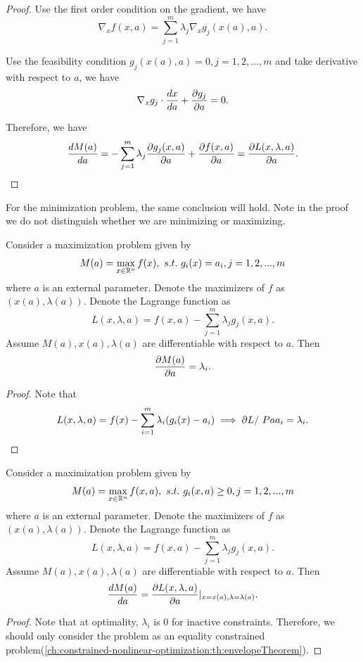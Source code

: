 \begin{refsection}
\begin{proof}
	Use the first order condition on the gradient, we have
	$$ \nabla_x f(x,a)= \sum_{j=1}^m \lambda_j \nabla_x g_j(x(a),a).$$
	
	Use the feasibility condition $g_j(x(a),a) = 0, j=1,2,...,m$ and take derivative with respect to $a$, we have
	$$\nabla_x g_j \cdot \frac{dx}{da} + \frac{\partial g_j}{\partial a} = 0.$$
	
Therefore, we have
		$$\frac{dM(a)}{da} = -\sum_{j=1}^m \lambda_j \frac{\partial g_j(x,a)}{\partial a} +  \frac{\partial f(x,a)}{\partial a} = \frac{\partial L(x,\lambda, a)}{\partial a}.$$
\end{proof}

\begin{remark}
For the minimization problem, the same conclusion will hold. Note in the proof we do not distinguish whether we are minimizing or maximizing. 
	
\end{remark}

\begin{corollary}\cite[369]{jiang2000advanced}\cite[605]{jehle2011advanced}
	Consider a maximization problem given by
	$$M(a) = \max_{x\in \mathbb{R}^n} f(x), ~s.t.~ g_i(x) = a_i, j=1,2,...,m$$
	where $a$ is an external parameter.  Denote the maximizers of $f$ as $(x(a),\lambda(a))$. Denote the Lagrange function as
	$$L(x,\lambda,a) = f(x,a) - \sum_{j=1}^m \lambda_j g_j(x,a).$$
	Assume $M(a), x(a), \lambda(a)$ are differentiable with respect to $a$.
	Then
	$$\frac{\partial M(a)}{\partial a} = \lambda_i.$$
\end{corollary}
\begin{proof}
Note that 
$$L(x,\lambda, a) = f(x) -\sum_{i=1}^{m} \lambda_i(g_i(x) - a_i) \implies \partial L /\ Pa a_i = \lambda_i.$$
\end{proof}


\begin{lemma}\cite[369]{jiang2000advanced}\cite[605]{jehle2011advanced}
	Consider a maximization problem given by
	$$M(a) = \max_{x\in \mathbb{R}^n} f(x,a), ~s.t.~ g_i(x,a) \geq 0, j=1,2,...,m$$
	where $a$ is an external parameter.  Denote the maximizers of $f$ as $(x(a),\lambda(a))$. Denote the Lagrange function as
	$$L(x,\lambda,a) = f(x,a) - \sum_{j=1}^m \lambda_j g_j(x,a).$$
	Assume $M(a), x(a), \lambda(a)$ are differentiable with respect to $a$.
	Then
	$$\frac{dM(a)}{da} = \frac{\partial L(x,\lambda,a)}{\partial a}|_{x=x(a), \lambda = \lambda(a)}.$$
\end{lemma}
\begin{proof}
Note that at optimality, $\lambda_i$ is 0 for inactive constraints. Therefore, we should only consider the problem as an equality constrained problem(\autoref{ch:constrained-nonlinear-optimization:th:envelopeTheorem}). 
\end{proof}


\end{refsection}
